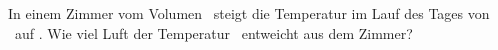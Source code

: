 In einem Zimmer vom Volumen \VzO\ steigt die Temperatur im Lauf des Tages von \thEiO\ auf \thZwO. Wie viel Luft der Temperatur \thZwO\ entweicht aus dem Zimmer?
